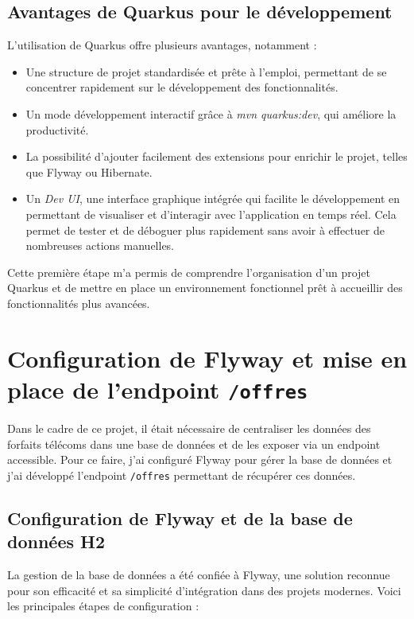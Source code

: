 \documentclass[11pt]{article}
\begin{document}
		\subsection{Avantages de Quarkus pour le développement}
		
		L’utilisation de Quarkus offre plusieurs avantages, notamment :
		\begin{itemize}
			\item Une structure de projet standardisée et prête à l’emploi, permettant de se concentrer rapidement sur le développement des fonctionnalités.
			\item Un mode développement interactif grâce à \textit{mvn quarkus:dev}, qui améliore la productivité.
			\item La possibilité d’ajouter facilement des extensions pour enrichir le projet, telles que Flyway ou Hibernate.
			\item Un \textit{Dev UI}, une interface graphique intégrée qui facilite le développement en permettant de visualiser et d'interagir avec l'application en temps réel. Cela permet de tester et de déboguer plus rapidement sans avoir à effectuer de nombreuses actions manuelles.
		\end{itemize}
		
		Cette première étape m’a permis de comprendre l’organisation d’un projet Quarkus et de mettre en place un environnement fonctionnel prêt à accueillir des fonctionnalités plus avancées.
		
		\section{Configuration de Flyway et mise en place de l'endpoint \texttt{/offres}}
		
		Dans le cadre de ce projet, il était nécessaire de centraliser les données des forfaits télécoms dans une base de données et de les exposer via un endpoint accessible. Pour ce faire, j'ai configuré Flyway pour gérer la base de données et j'ai développé l'endpoint \texttt{/offres} permettant de récupérer ces données.
		
		\subsection{Configuration de Flyway et de la base de données H2}
		
		La gestion de la base de données a été confiée à Flyway, une solution reconnue pour son efficacité et sa simplicité d'intégration dans des projets modernes. Voici les principales étapes de configuration :
		
\end{document}

